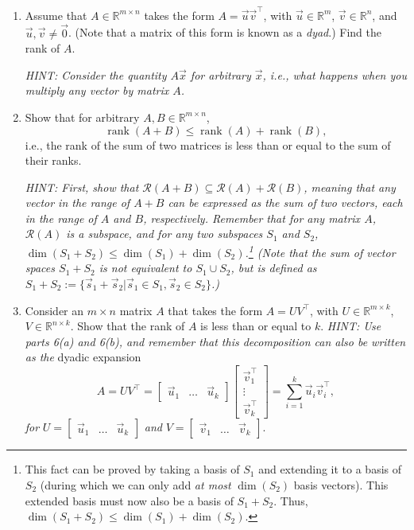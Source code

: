 \documentclass[10pt]{article}
\theoremstyle{definition}
\theoremstyle{plain}
\newcommand{\RR}{\mathbb{R}}
\newcommand{\Range}{\mathcal{R}}
\DeclareMathOperator{\rank}{rank}
\begin{document}
\begin{enumerate}[label=(\alph*)]
    \item Assume that $A \in \RR^{m \times n}$ takes the form $A = \vec{u}\vec{v}^\top$, with $\vec{u} \in \RR^m$, $\vec{v} \in \RR^n$, and $\vec{u}, \vec{v} \neq \vec{0}$. (Note that a matrix of this form is known as a \textit{dyad}.) Find the rank of $A$.

    \textit{HINT: Consider the quantity $A\vec{x}$ for arbitrary $\vec{x}$, i.e., what happens when you multiply any vector by matrix $A$.}

    \item Show that for arbitrary $A, B \in \RR^{m \times n}$,
    \begin{equation}
        \rank(A + B) \leq \rank(A) + \rank(B),
    \end{equation}
    i.e., the rank of the sum of two matrices is less than or equal to the sum of their ranks.

    \textit{HINT: First, show that $\Range(A + B) \subseteq \Range(A) + \Range(B)$, meaning that any vector in the range of $A + B$ can be expressed as the sum of two vectors, each in the range of $A$ and $B$, respectively. Remember that for any matrix $A$, $\Range(A)$ is a subspace, and for any two subspaces $S_1$ and $S_2$, $\dim(S_1 + S_2) \leq \dim(S_1) + \dim(S_2)$.\footnote{This fact can be proved by taking a basis of $S_1$ and extending it to a basis of $S_2$ (during which we can only add \textit{at most} $\dim(S_2)$ basis vectors). This extended basis must now also be a basis of $S_1 + S_2$. Thus, $\dim(S_1 + S_2) \leq \dim(S_1) + \dim(S_2)$.} (Note that the sum of vector spaces $S_1 + S_2$ is not equivalent to $S_1 \cup S_2$, but is defined as $S_1 + S_2 := \{\vec{s}_1 + \vec{s}_2 | \vec{s}_1 \in S_1, \vec{s}_2 \in S_2\}$.)}

    \item Consider an $m \times n$ matrix $A$ that takes the form $A = UV^\top$, with $U \in \RR^{m \times k}$, $V \in \RR^{n \times k}$. Show that the rank of $A$ is less than or equal to $k$. \textit{HINT: Use parts 6(a) and 6(b), and remember that this decomposition can also be written as the} dyadic expansion
    \begin{equation}
        A = UV^\top = \begin{bmatrix} \vec{u}_1 & \ldots & \vec{u}_k \end{bmatrix} \begin{bmatrix} \vec{v}_1^\top \\ \vdots \\ \vec{v}_k^\top \end{bmatrix} = \sum_{i=1}^{k} \vec{u}_i \vec{v}_i^\top,
    \end{equation}
    \textit{for} $U = \begin{bmatrix} \vec{u}_1 & \ldots & \vec{u}_k \end{bmatrix}$ \textit{and} $V = \begin{bmatrix} \vec{v}_1 & \ldots & \vec{v}_k \end{bmatrix}$.
\end{enumerate}
\end{document}
